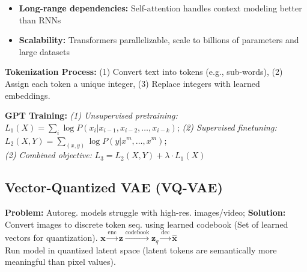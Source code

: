 \begin{itemize}
    \item \textbf{Long-range dependencies:} Self-attention handles context modeling better than RNNs
    \item \textbf{Scalability:} Transformers parallelizable, scale to billions of parameters and large datasets
\end{itemize}

\textbf{Tokenization Process:} (1) Convert text into tokens (e.g., sub-words), (2) Assign each token a unique integer, (3) Replace integers with learned embeddings.

\textbf{GPT Training:} {\small \textit{(1) Unsupervised pretraining:} $L_1(X) = \sum_i \log P(x_i | x_{i-1}, x_{i-2}, \ldots, x_{i-k})$; \textit{(2) Supervised finetuning:} $L_2(X,Y) = \sum_{(x,y)} \log P(y | x^m, \ldots, x^m)$; \\ \textit{(2) Combined objective:} $L_3 = L_2(X,Y) + \lambda \cdot L_1(X)$}

\subsection{Vector-Quantized VAE (VQ-VAE)}

\textbf{Problem:} Autoreg. models struggle with high-res. images/video; 
\textbf{Solution:} Convert images to discrete token seq. using learned codebook (Set of learned vectors for quantization). {\scriptsize$\mathbf{x} \xrightarrow{\text{enc}} \mathbf{z} \xrightarrow{\text{codebook}} \mathbf{z}_q \xrightarrow{\text{dec}} \hat{\mathbf{x}}$} \\
{\small Run model in quantized latent space (latent tokens are semantically more meaningful than pixel values).}